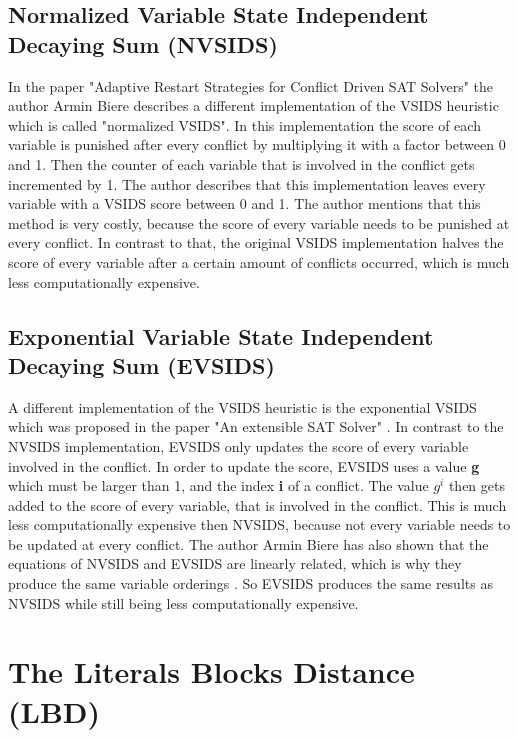 \subsection{Normalized Variable State Independent Decaying Sum (NVSIDS)}
\label{sec:NVSIDS}

In the paper "Adaptive Restart Strategies for Conflict Driven SAT Solvers" \cite{biere2008adaptive} the author Armin Biere describes a different implementation of the VSIDS heuristic which is called "normalized VSIDS". In this implementation the score of each variable is punished after every conflict by multiplying it with a factor between 0 and 1. Then the counter of each variable that is involved in the conflict gets incremented by 1. The author describes that this implementation leaves every variable with a VSIDS score between 0 and 1. The author mentions that this method is very costly, because the score of every variable needs to be punished at every conflict. In contrast to that, the original VSIDS implementation halves the score of every variable after a certain amount of conflicts occurred, which is much less computationally expensive.

\subsection{Exponential Variable State Independent Decaying Sum (EVSIDS)}

A different implementation of the VSIDS heuristic is the exponential VSIDS which was proposed in the paper "An extensible SAT Solver" \cite{een2003extensible}. In contrast to the NVSIDS implementation, EVSIDS only updates the score of every variable involved in the conflict. In order to update the score, EVSIDS uses a value \textbf{g} which must be larger than 1, and the index \textbf{i} of a conflict. The value $g^{i}$ then gets added to the score of every variable, that is involved in the conflict. This is much less computationally expensive then NVSIDS, because not every variable needs to be updated at every conflict. The author Armin Biere has also shown that the equations of NVSIDS and EVSIDS are linearly related, which is why they produce the same variable orderings \cite{biere2008adaptive}. So EVSIDS produces the same results as NVSIDS while still being less computationally expensive.

\section{The Literals Blocks Distance (LBD)}

